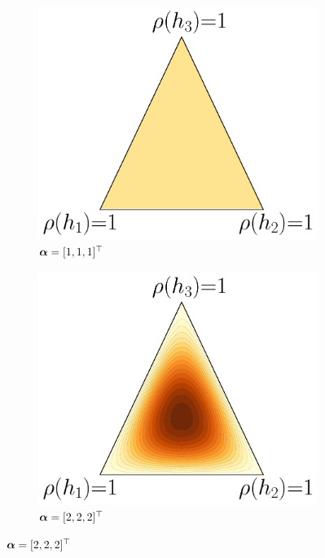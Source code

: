 \begin{figure}
\centering
\begin{subfigure}{0.32\textwidth}
    \includegraphics[width=\textwidth]{chapter_5/figures/dirichlet_1_1_1.pdf}
    \caption{$\boldsymbol{\alpha}=[1, 1, 1]^{\top}$}
\end{subfigure}
\hfill
\begin{subfigure}{0.32\textwidth}
    \includegraphics[width=\textwidth]{chapter_5/figures/dirichlet_2_2_2.pdf}
    \caption{$\boldsymbol{\alpha}=[2, 2, 2]^{\top}$}
\end{subfigure}

\end{figure}

